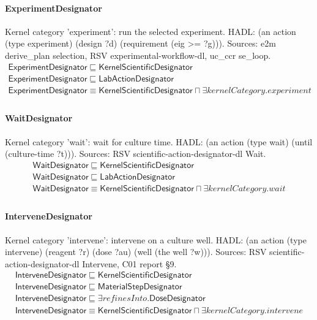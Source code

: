 \documentclass[10pt]{article}
\begin{document}
\paragraph{ExperimentDesignator} Kernel category 'experiment': run the selected experiment. HADL: (an action (type experiment) (design ?d) (requirement (eig >= ?g))). Sources: e2m derive\_plan selection, RSV experimental-workflow-dl, uc\_ccr se\_loop.
\[\begin{array}{l}
\mathsf{ExperimentDesignator} \sqsubseteq  \mathsf{KernelScientificDesignator} \\
\mathsf{ExperimentDesignator} \sqsubseteq  \mathsf{LabActionDesignator} \\
\mathsf{ExperimentDesignator} \equiv  \mathsf{KernelScientificDesignator} \sqcap  \exists \mathit{kernelCategory}.{experiment} \\
\end{array}\]
\paragraph{WaitDesignator} Kernel category 'wait': wait for culture time. HADL: (an action (type wait) (until (culture-time ?t))). Sources: RSV scientific-action-designator-dl Wait.
\[\begin{array}{l}
\mathsf{WaitDesignator} \sqsubseteq  \mathsf{KernelScientificDesignator} \\
\mathsf{WaitDesignator} \sqsubseteq  \mathsf{LabActionDesignator} \\
\mathsf{WaitDesignator} \equiv  \mathsf{KernelScientificDesignator} \sqcap  \exists \mathit{kernelCategory}.{wait} \\
\end{array}\]
\paragraph{InterveneDesignator} Kernel category 'intervene': intervene on a culture well. HADL: (an action (type intervene) (reagent ?r) (dose ?au) (well (the well ?w))). Sources: RSV scientific-action-designator-dl Intervene, C01 report §9.
\[\begin{array}{l}
\mathsf{InterveneDesignator} \sqsubseteq  \mathsf{KernelScientificDesignator} \\
\mathsf{InterveneDesignator} \sqsubseteq  \mathsf{MaterialStepDesignator} \\
\mathsf{InterveneDesignator} \sqsubseteq  \exists \mathit{refinesInto}.\mathsf{DoseDesignator} \\
\mathsf{InterveneDesignator} \equiv  \mathsf{KernelScientificDesignator} \sqcap  \exists \mathit{kernelCategory}.{intervene} \\
\end{array}\]
\end{document}
